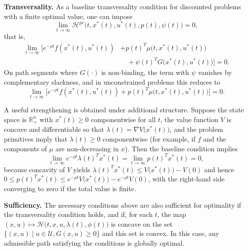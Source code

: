 \documentclass[../../lecture_notes.tex]{subfiles}
\begin{document}
\medskip

\textbf{Transversality.} As a baseline transversality condition for discounted problems with a finite optimal value, one can impose
\begin{equation*}
  \lim_{t\to\infty}\mathcal{H}^{pv}\bigl(t,x^{\ast}(t),u^{\ast}(t),p(t),\psi(t)\bigr)=0,
\end{equation*}
that is,
\begin{align*}
  \lim_{t\to\infty}\bigl[e^{-\rho t}f(x^{\ast}(t),u^{\ast}(t))&+p(t)^{T}\mu\bigl(t,x^{\ast}(t),u^{\ast}(t)\bigr)\\
  &\quad+\psi(t)^{T}G\bigl(x^{\ast}(t),u^{\ast}(t)\bigr)\bigr]=0.
\end{align*}
On path segments where $G(\cdot)$ is non-binding, the term with $\psi$ vanishes by complementary slackness, and in unconstrained problems this reduces to
\begin{equation*}
  \lim_{t\to\infty}\bigl[e^{-\rho t}f(x^{\ast}(t),u^{\ast}(t))+p(t)^{T}\mu\bigl(t,x^{\ast}(t),u^{\ast}(t)\bigr)\bigr]=0.
\end{equation*}

A useful strengthening is obtained under additional structure.
Suppose the state space is $\mathbb{R}_{+}^{n}$ with $x^{\ast}(t)\ge 0$ componentwise for all $t$, the value function $V$ is concave and differentiable so that $\lambda(t)=\nabla V\bigl(x^{\ast}(t)\bigr)$, and the problem primitives imply that $\lambda(t)\ge 0$ componentwise (for example, if $f$ and the components of $\mu$ are non-decreasing in $x$).
Then the baseline condition implies
\begin{equation*}
  \lim_{t\to\infty} e^{-\rho t}\lambda(t)^{T}x^{\ast}(t)=\lim_{t\to\infty} p(t)^{T}x^{\ast}(t)=0,
\end{equation*}
because concavity of $V$ yields $\lambda(t)^{T}x^{\ast}(t)\le V\bigl(x^{\ast}(t)\bigr)-V(0)$ and hence $0\le p(t)^{T}x^{\ast}(t)\le e^{-\rho t}V\bigl(x^{\ast}(t)\bigr)-e^{-\rho t}V(0)$, with the right-hand side converging to zero if the total value is finite.

\medskip

\textbf{Sufficiency.} The necessary conditions above are also sufficient for optimality if the transversality condition holds, and if, for each $t$, the map $(x,u)\mapsto \mathcal{H}\bigl(t,x,u,\lambda(t),\phi(t)\bigr)$ is concave on the set $\{(x,u) \mid u \in \mathcal{U}, G(x,u) \ge 0\}$ and this set is convex.
In this case, any admissible path satisfying the conditions is globally optimal.
\end{document}
